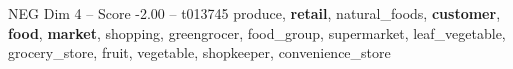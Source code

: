 \begin{textsample}{NEG Dim 4 – Score -2.00 – t013745}  \label{ex:f4_neg_016}
produce, \textbf{retail}, natural\_foods, \textbf{customer}, \textbf{food}, \textbf{market}, shopping, greengrocer, food\_group, supermarket, leaf\_vegetable, grocery\_store, fruit, vegetable, shopkeeper, convenience\_store

\end{textsample}
